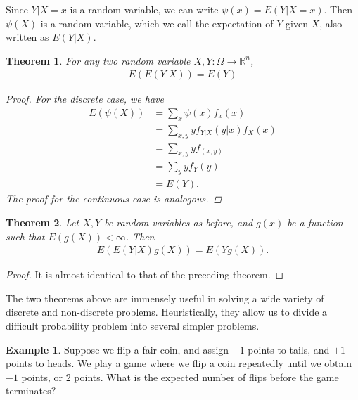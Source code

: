 \documentclass[12pt]{article}
\newcommand{\rr}{\mathbb{R}}
\theoremstyle{plain}
\newtheorem{theorem}{Theorem}
\theoremstyle{definition}
\newtheorem*{example}{Example}
\theoremstyle{remark}
\numberwithin{equation}{section}  %
\begin{document}
Since $Y|X =x$ is a random variable, we can write $\psi(x) = E(Y | X =x)$.
Then $\psi(X)$ is a random variable, which we call the expectation of $Y$ given
$X$, also written as $E(Y|X)$.
\begin{theorem}
For any two random variable $X,Y: \Omega \to \rr^n$,
\begin{align*}
E(E(Y | X)) = E(Y)
\end{align*}
\begin{proof}
For the discrete case, we have
\begin{align*}
E(\psi(X)) 
& = \sum_{x} \psi(x) f_x(x)
\\
& = \sum_{x,y} y f_{Y|X}(y|x) f_X(x)
\\
& = \sum_{x,y} y f_{(x,y)}
\\
& = \sum_y y f_Y(y)
\\
& = E(Y).
\end{align*}
The proof for the continuous case is analogous. 
\end{proof}
\end{theorem}
\begin{theorem}
Let $X,Y$ be random variables as before, and $g(x)$ be a function such that
$E(g(X))< \infty$. Then
\begin{align*}
E(E(Y|X)g(X)) = E(Yg(X)).
\end{align*}
\end{theorem}
\begin{proof}
It is almost identical to that of the preceding theorem.
\end{proof}
The two theorems above are immensely useful in solving a wide variety of
discrete and non-discrete problems. Heuristically, they allow us to divide a
difficult probability problem into several simpler problems.

\begin{example}
Suppose we flip a fair coin, and assign $-1$ points to tails, and $+1$ points to
heads. We play a game where we flip a coin repeatedly until we obtain
$-1$ points, or $2$ points. What is the expected number of flips before the
game terminates? 
\end{example}
\end{document}
